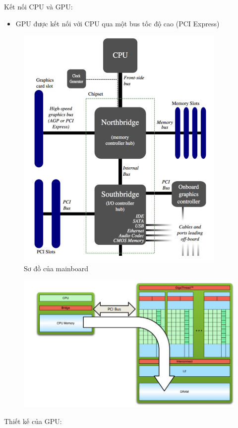 \documentclass[14pt, a4paper]{article}
\numberwithin{equation}{section}
\numberwithin{figure}{section}
\numberwithin{dl}{section}
\numberwithin{md}{section}
\numberwithin{bd}{section}
\numberwithin{dn}{section}
\numberwithin{hq}{section}
\begin{document}
Kết nối CPU và GPU:

\begin{itemize}
    \item GPU được kết nối với CPU qua một bus tốc độ cao (PCI Express)
\end{itemize}

\begin{figure}[H]
    \centering
    \includegraphics[width=0.6\linewidth]{figures/CUDA/Mainboard.png}
    \caption{Sơ đồ của mainboard}
\end{figure}

\begin{figure}[H]
    \centering
    \includegraphics[width=0.6\linewidth]{figures/CUDA/PCIe.png}
\end{figure}

Thiết kế của GPU:
\end{document}
